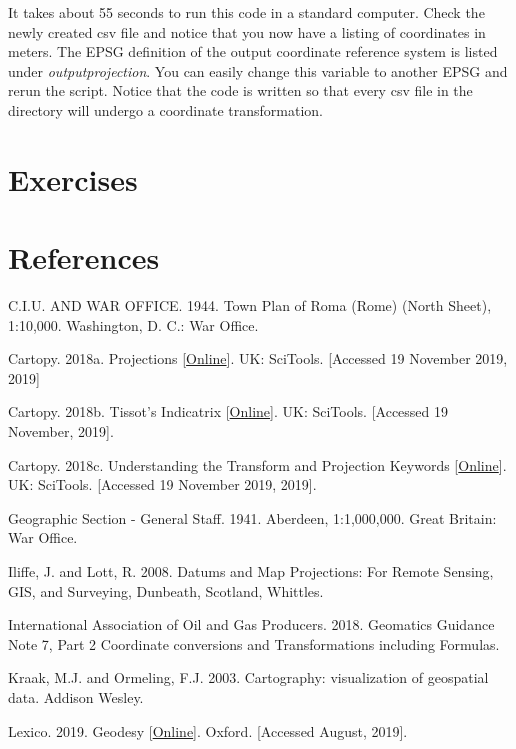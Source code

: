 \documentclass[a4paper , 12pt]{book}
\begin{document}
It takes about 55 seconds to run this code in a standard computer. Check the newly created csv file and notice that you now have a listing of coordinates in meters. The EPSG definition of the output coordinate reference system is listed under \textit{output\textunderscore projection}. You can easily change this variable to another EPSG and rerun the script. Notice that the code is written so that every csv file in the directory will undergo a coordinate transformation. 

\section{Exercises}

\section*{References}

C.I.U. AND WAR OFFICE. 1944. Town Plan of Roma (Rome) (North Sheet), 1:10,000. Washington, D. C.: War Office.

Cartopy. 2018a. Projections [\href{https://scitools.org.uk/cartopy/docs/latest/crs/projections.html}{Online}]. UK: SciTools. [Accessed 19 November 2019, 2019]

Cartopy. 2018b. Tissot’s Indicatrix [\href{https://scitools.org.uk/cartopy/docs/latest/gallery/tissot.html}{Online}]. UK: SciTools. [Accessed 19 November, 2019].

Cartopy. 2018c. Understanding the Transform and Projection Keywords [\href{https://scitools.org.uk/cartopy/docs/latest/tutorials/understanding_transform.html}{Online}]. UK: SciTools. [Accessed 19 November 2019, 2019].

Geographic Section - General Staff. 1941. Aberdeen, 1:1,000,000. Great Britain: War Office.

Iliffe, J. and Lott, R. 2008. Datums and Map Projections: For Remote Sensing, GIS, and Surveying, Dunbeath, Scotland, Whittles.

International Association of Oil and Gas Producers. 2018. Geomatics Guidance Note 7, Part 2 Coordinate conversions and Transformations including Formulas.

Kraak, M.J. and Ormeling, F.J. 2003. Cartography: visualization of geospatial data. Addison Wesley.

Lexico. 2019. Geodesy [\href{https://www.lexico.com/en/definition/geodesy}{Online}]. Oxford. [Accessed August, 2019].
\end{document}
